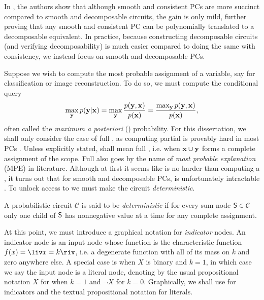 In \citet{peharz15}, the authors show that although smooth and consistent PCs are more succinct
\citep{darwiche02} compared to smooth and decomposable circuits, the gain is only mild, further
proving that any smooth and consistent PC can be polynomially translated to a decomposable
equivalent. In practice, because constructing decomposable circuits (and verifying decomposability)
is much easier compared to doing the same with consistency, we instead focus on smooth and
decomposable PCs.

Suppose we wish to compute the most probable assignment of a variable, say for classification or
image reconstruction. To do so, we must compute the conditional query
\begin{equation}
  \max_{\mathbf{y}}p(\mathbf{y}|\mathbf{x})=\max_{\mathbf{y}}\frac{p(\mathbf{y},\mathbf{x})}{p(\mathbf{x})}=
  \frac{\max_{\mathbf{y}}p(\mathbf{y},\mathbf{x})}{p(\mathbf{x})},
  \label{eq:map}
\end{equation}
often called the \emph{maximum a posteriori} (\map) probability. For this dissertation, we shall
only consider the case of full \map{}, as computing partial \map{} is provably hard in most PCs
\citep{peharz16,decampos11}.  Unless explicitly stated, \map{} shall mean full \map{}, i.e. when
$\mathbf{x}\cup\mathbf{y}$ forms a complete assignment of the scope. Full \map{} also goes by the name of
\emph{most probable explanation} (MPE) in literature.  Although at first it seems like \map{} is no
harder than computing a \con{}, it turns out that for smooth and decomposable PCs, \map{} is
unfortunately intractable \citep{conaty17,mei18}. To unlock access to \map{} we must make the
circuit \emph{deterministic}.

\begin{definition}[Determinism]
  A probabilistic circuit $\mathcal{C}$ is said to be \emph{deterministic} if for every sum node
  $\operatorname{\textsf{S}}\in\mathcal{C}$ only one child of $\operatorname{\textsf{S}}$ has nonnegative value at a time for any complete
  assignment.
\end{definition}

At this point, we must introduce a graphical notation for \emph{indicator} nodes. An indicator node
is an input node whose function is the characteristic function $f(x)=\liv x=k\riv$, i.e. a
degenerate function with all of its mass on $k$ and zero anywhere else. A special case is when $X$
is binary and $k=1$, in which case we say the input node is a literal node, denoting by the usual
propositional notation $X$ for when $k=1$ and $\neg X$ for $k=0$. Graphically, we shall use
\inode{\newLeafNode} for indicators and the textual propositional notation for literals.


